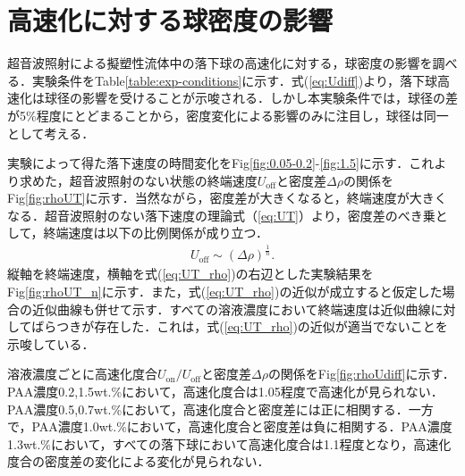 \section{高速化に対する球密度の影響}
\label{sec:density}
超音波照射による擬塑性流体中の落下球の高速化に対する，球密度の影響を調べる．実験条件をTable\ref{table:exp-conditions}に示す．式(\ref{eq:Udiff})より，落下球高速化は球径の影響を受けることが示唆される．しかし本実験条件では，球径の差が5\%程度にとどまることから，密度変化による影響のみに注目し，球径は同一として考える．

実験によって得た落下速度の時間変化をFig\ref{fig:0.05-0.2}-\ref{fig:1.5}に示す．これより求めた，超音波照射のない状態の終端速度$U_\text{off}$と密度差$\Delta\rho$の関係をFig\ref{fig:rhoUT}に示す．当然ながら，密度差が大きくなると，終端速度が大きくなる．超音波照射のない落下速度の理論式（\ref{eq:UT}）より，密度差のべき乗として，終端速度は以下の比例関係が成り立つ．
\begin{eqnarray}
    U_\text{off}\sim \left(\Delta\rho\right)^{\frac{1}{n}} .
    \label{eq:UT_rho}
\end{eqnarray}
縦軸を終端速度，横軸を式(\ref{eq:UT_rho})の右辺とした実験結果をFig\ref{fig:rhoUT_n}に示す．また，式(\ref{eq:UT_rho})の近似が成立すると仮定した場合の近似曲線も併せて示す．すべての溶液濃度において終端速度は近似曲線に対してばらつきが存在した．これは，式(\ref{eq:UT_rho})の近似が適当でないことを示唆している．

溶液濃度ごとに高速化度合$U_\text{on}/U_\text{off}$と密度差$\Delta\rho$の関係をFig\ref{fig:rhoUdiff}に示す．PAA濃度0.2,1.5wt.\%において，高速化度合は1.05程度で高速化が見られない．PAA濃度0.5,0.7wt.\%において，高速化度合と密度差には正に相関する．一方で，PAA濃度1.0wt.\%において，高速化度合と密度差は負に相関する．PAA濃度1.3wt.\%において，すべての落下球において高速化度合は1.1程度となり，高速化度合の密度差の変化による変化が見られない．

